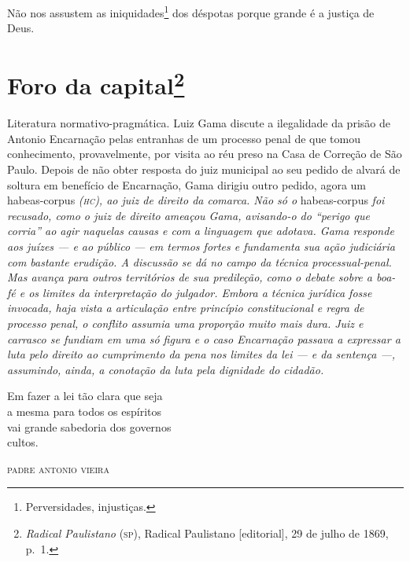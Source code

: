 Não nos assustem as iniquidades\footnote{Perversidades, injustiças.}
dos déspotas porque grande é a justiça de Deus.

\chapter{Foro da capital\footnote{\emph{Radical Paulistano} (\textsc{sp}), Radical Paulistano {[}editorial{]},
  29 de julho de 1869, p.~1.}}

\begin{didascalia}
Literatura normativo-pragmática. Luiz Gama discute a ilegalidade da
prisão de Antonio Encarnação pelas entranhas de um processo penal de que
tomou conhecimento, provavelmente, por visita ao réu preso na Casa de
Correção de São Paulo. Depois de não obter resposta do juiz municipal ao
seu pedido de alvará de soltura em benefício de Encarnação, Gama dirigiu
outro pedido, agora um habeas-corpus \emph{(\textsc{hc}), ao juiz de direito da
comarca. Não só o} habeas-corpus \emph{foi recusado, como o juiz de
direito ameaçou Gama, avisando-o do ``perigo que corria'' ao agir
naquelas causas e com a linguagem que adotava. Gama responde aos juízes
--- e ao público --- em termos fortes e fundamenta sua ação judiciária com
bastante erudição. A discussão se dá no campo da técnica
processual-penal. Mas avança para outros territórios de sua predileção,
como o debate sobre a boa-fé e os limites da interpretação do julgador.
Embora a técnica jurídica fosse invocada, haja vista a articulação entre
princípio constitucional e regra de processo penal, o conflito assumia
uma proporção muito mais dura. Juiz e carrasco se fundiam em uma só
figura e o caso Encarnação passava a expressar a luta pelo direito ao
cumprimento da pena nos limites da lei --- e da sentença ---, assumindo,
ainda, a conotação da luta pela dignidade do cidadão.}
\end{didascalia}


\epigraph{Em fazer a lei tão clara que seja\\
a mesma para todos os espíritos\\
vai grande sabedoria dos governos\\
cultos.}{\textsc{padre antonio vieira}\footnotemark}


